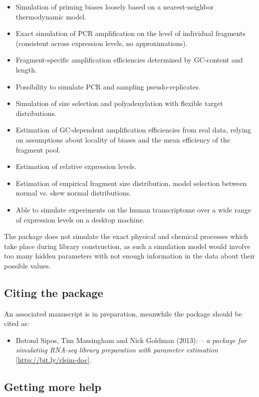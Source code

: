 \begin{itemize}
\item{Simulation of priming biases loosely based on a nearest-neighbor thermodynamic model.}
\item{Exact simulation of PCR amplification on the level of individual fragments (consistent across expression levels, no approximations).}
\item{Fragment-specific amplification efficiencies determined by GC-content and length.}
\item{Possibility to simulate PCR and sampling pseudo-replicates.}
\item{Simulation of size selection and polyadenylation with flexible target distributions.}
\item{Estimation of GC-dependent amplification efficiencies from real data, relying on assumptions about locality of biases and the mean efficiency of the fragment pool.}
\item{Estimation of relative expression levels.}
\item{Estimation of empirical fragment size distribution, model selection between normal vs. skew normal distributions.}
\item{Able to simulate experiments on the human transcriptome over a wide range of expression levels on a desktop machine.}
\end{itemize}

The \rlsim package does not simulate the exact physical and chemical processes which take place during library construction, as such a simulation model would involve too many hidden parameters with not enough information in the data about their possible values. 

\subsection{Citing the package}
\label{ss:citing}

An associated manuscript is in preparation, meanwhile the package should be cited as:

\begin{itemize}
\item[]{{Botond Sipos, Tim Massingham and Nick Goldman (2013): {\it \texttt{\rlsim} -- a package for simulating RNA-seq library preparation with parameter estimation} [\href{http://bit.ly/rlsim-doc}{http://bit.ly/rlsim-doc}].}}

\end{itemize}

\subsection{Getting more help}
\label{ss:more_help}

